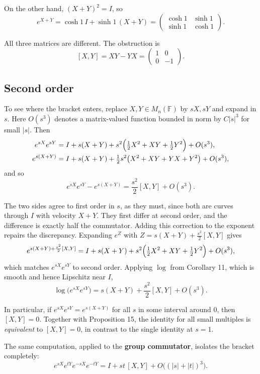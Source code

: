 \documentclass[11pt]{article}
\begin{document}
On the other hand, $(X + Y)^2 = I$, so
\[
e^{X+Y} = \cosh 1\, I + \sinh 1\, (X + Y) = \begin{pmatrix} \cosh 1 & \sinh 1 \\ \sinh 1 & \cosh 1 \end{pmatrix}.
\]

All three matrices are different. The obstruction is
\[
[X, Y] = XY - YX = \begin{pmatrix} 1 & 0 \\ 0 & -1 \end{pmatrix}.
\]

\subsection{Second order}

To see where the bracket enters, replace $X, Y \in M_n(\mathbb{F})$ by $sX, sY$ and expand in $s$. Here $O(s^3)$ denotes a matrix-valued function bounded in norm by $C|s|^3$ for small $|s|$. Then
\[
\begin{aligned}
e^{sX} e^{sY} &= I + s(X + Y) + s^2\Bigl(\tfrac12 X^2 + XY + \tfrac12 Y^2\Bigr) + O(s^3), \\
e^{s(X+Y)} &= I + s(X + Y) + \tfrac12 s^2 \bigl(X^2 + XY + YX + Y^2\bigr) + O(s^3),
\end{aligned}
\]
and so
\[
e^{sX} e^{sY} - e^{s(X+Y)} = \frac{s^2}{2}[X, Y] + O(s^3).
\]

The two sides agree to first order in $s$, as they must, since both are curves through $I$ with velocity $X + Y$. They first differ at second order, and the difference is exactly half the commutator. Adding this correction to the exponent repairs the discrepancy. Expanding $e^Z$ with $Z = s(X + Y) + \frac{s^2}{2}[X, Y]$ gives
\[
e^{s(X+Y) + \frac{s^2}{2}[X, Y]} = I + s(X+Y) + s^2\Bigl(\tfrac12 X^2 + XY + \tfrac12 Y^2\Bigr) + O(s^3),
\]
which matches $e^{sX}e^{sY}$ to second order. Applying $\log$ from Corollary 11, which is smooth and hence Lipschitz near $I$,
\[
\log\bigl(e^{sX} e^{sY}\bigr) = s(X + Y) + \frac{s^2}{2}[X, Y] + O(s^3).
\]

In particular, if $e^{sX}e^{sY} = e^{s(X+Y)}$ for all $s$ in some interval around $0$, then $[X, Y] = 0$. Together with Proposition 15, the identity for all small multiples is \emph{equivalent} to $[X, Y] = 0$, in contrast to the single identity at $s = 1$.

The same computation, applied to the \textbf{group commutator}, isolates the bracket completely:
\[
e^{sX} e^{tY} e^{-sX} e^{-tY} = I + st\,[X, Y] + O\bigl((|s| + |t|)^3\bigr).
\]
\end{document}
